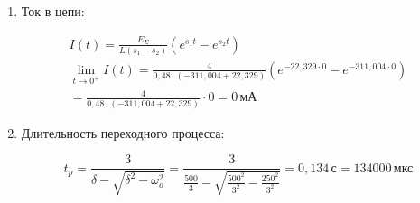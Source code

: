 \begin{enumerate}
	\item Ток в цепи:

	      \[
		      \begin{gathered}
			      I(t) = \frac{E_\Sigma}{L (s_1 - s_2)}(e^{s_1 t} - e^{s_2 t}) \\
			      \lim_{t \to 0^+} I(t) = \frac{4}{0,48 \cdot (-311,004+22,329)}(e^{-22,329 \cdot 0} - e^{-311,004 \cdot 0})\\
			      = \frac{4}{0,48 \cdot (-311,004+22,329)} \cdot 0 = 0 \, \text{мА}

		      \end{gathered}
	      \]

	\item Длительность переходного процесса:

	      \[
		      t_p = \frac{3}{\delta - \sqrt{\delta^2 - \omega_o^2}} = \frac{3}{\frac{500}{3} - \sqrt{\frac{500^2}{3^2} - \frac{250^2}{3^2}}} = 0,134 \, \text{с} = 134000 \, \text{мкс}
	      \]
\end{enumerate}
